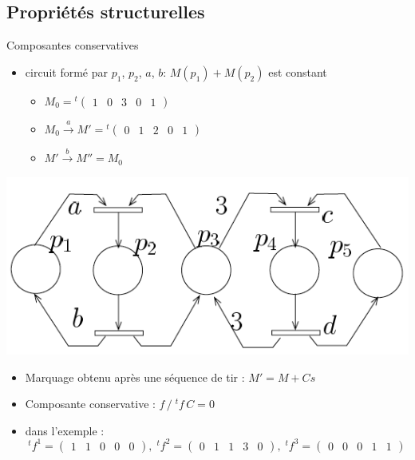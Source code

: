 \documentclass[compress]{beamer}
\begin{document}
\subsection{Propriétés structurelles}
\begin{frame}{Composantes conservatives}
\begin{itemize}
\item circuit formé par $p_1$, $p_2$, $a$, $b$: $M(p_1) + M(p_2)$ est constant
	\begin{itemize}
	\item $M_0 = {}^t\begin{pmatrix}1 & 0 & 3 & 0 & 1\end{pmatrix}$
	\item $M_0 \stackrel{a}{\longrightarrow} 
		M'= {}^t\begin{pmatrix}0 & 1 & 2 & 0 & 1\end{pmatrix}$
	\item $M' \stackrel{b}{\longrightarrow} M'' = M_0$
	\end{itemize}
\end{itemize}
\begin{center}
	\includegraphics[width=.4\linewidth]{inv}
\end{center}
\begin{itemize}
\item Marquage obtenu après une séquence de tir : $M' = M + Cs$
\item Composante conservative : $f \, / \; {}^tf \, C = 0$
\item dans l'exemple :
$$\scriptstyle
{}^tf^1 = \begin{pmatrix}1&1&0&0&0\end{pmatrix}, \;
{}^tf^2 = \begin{pmatrix}0&1&1&3&0\end{pmatrix}, \;
{}^tf^3 = \begin{pmatrix}0&0&0&1&1\end{pmatrix}$$
\end{itemize}
\end{frame}
\end{document}
